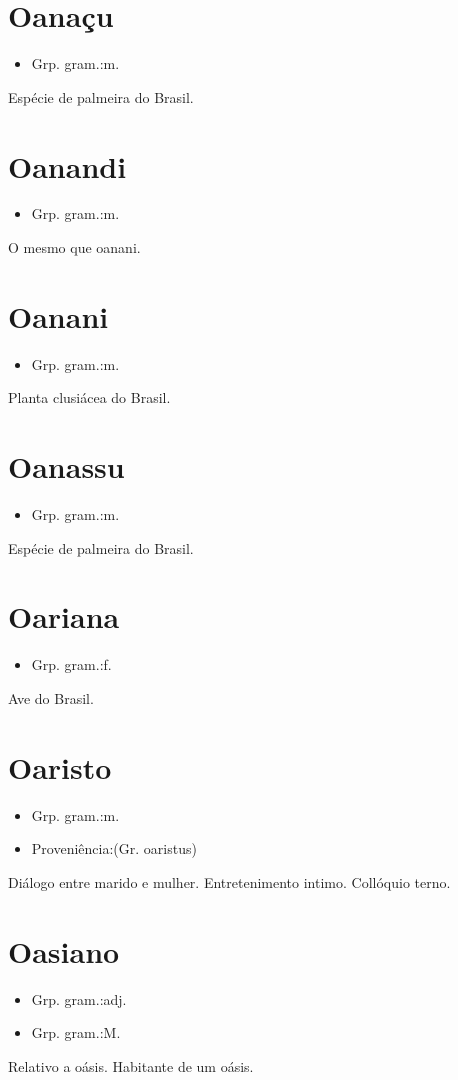\section{Oanaçu}
\begin{itemize}
\item {Grp. gram.:m.}
\end{itemize}
Espécie de palmeira do Brasil.
\section{Oanandi}
\begin{itemize}
\item {Grp. gram.:m.}
\end{itemize}
O mesmo que \textunderscore oanani\textunderscore .
\section{Oanani}
\begin{itemize}
\item {Grp. gram.:m.}
\end{itemize}
Planta clusiácea do Brasil.
\section{Oanassu}
\begin{itemize}
\item {Grp. gram.:m.}
\end{itemize}
Espécie de palmeira do Brasil.
\section{Oariana}
\begin{itemize}
\item {Grp. gram.:f.}
\end{itemize}
Ave do Brasil.
\section{Oaristo}
\begin{itemize}
\item {Grp. gram.:m.}
\end{itemize}
\begin{itemize}
\item {Proveniência:(Gr. \textunderscore oaristus\textunderscore )}
\end{itemize}
Diálogo entre marido e mulher.
Entretenimento intimo.
Collóquio terno.
\section{Oasiano}
\begin{itemize}
\item {Grp. gram.:adj.}
\end{itemize}
\begin{itemize}
\item {Grp. gram.:M.}
\end{itemize}
Relativo a oásis.
Habitante de um oásis.
